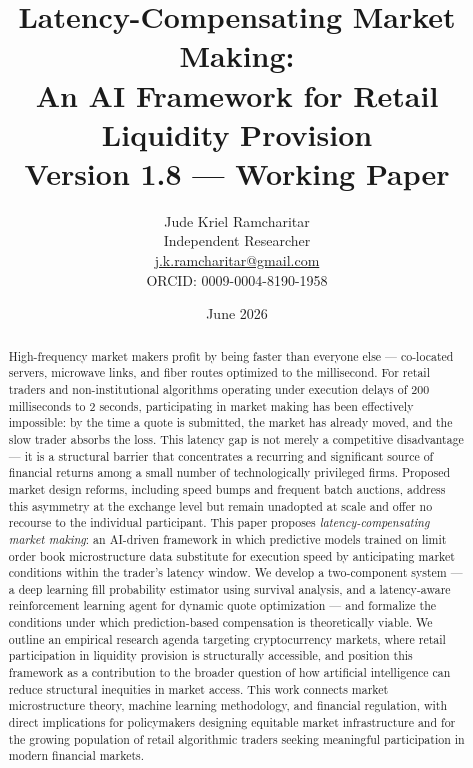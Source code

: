 \documentclass[12pt]{article}
\title{
  \textbf{Latency-Compensating Market Making:}\\[4pt]
  \textbf{An AI Framework for Retail Liquidity Provision}\\[10pt]
  \large Version 1.8 --- Working Paper
}
\author{
  Jude Kriel Ramcharitar\\[4pt]
  \small Independent Researcher\\
  \small \href{mailto:j.k.ramcharitar@gmail.com}{j.k.ramcharitar@gmail.com}\\
  \small ORCID: 0009-0004-8190-1958
}
\date{June 2026}
\begin{document}
\maketitle
\thispagestyle{empty}

\begin{abstract}
High-frequency market makers profit by being faster than everyone else --- co-located servers, microwave links, and fiber routes optimized to the millisecond. For retail traders and non-institutional algorithms operating under execution delays of 200 milliseconds to 2 seconds, participating in market making has been effectively impossible: by the time a quote is submitted, the market has already moved, and the slow trader absorbs the loss. This latency gap is not merely a competitive disadvantage --- it is a structural barrier that concentrates a recurring and significant source of financial returns among a small number of technologically privileged firms. Proposed market design reforms, including speed bumps and frequent batch auctions, address this asymmetry at the exchange level but remain unadopted at scale and offer no recourse to the individual participant. This paper proposes \emph{latency-compensating market making}: an AI-driven framework in which predictive models trained on limit order book microstructure data substitute for execution speed by anticipating market conditions within the trader's latency window. We develop a two-component system --- a deep learning fill probability estimator using survival analysis, and a latency-aware reinforcement learning agent for dynamic quote optimization --- and formalize the conditions under which prediction-based compensation is theoretically viable. We outline an empirical research agenda targeting cryptocurrency markets, where retail participation in liquidity provision is structurally accessible, and position this framework as a contribution to the broader question of how artificial intelligence can reduce structural inequities in market access. This work connects market microstructure theory, machine learning methodology, and financial regulation, with direct implications for policymakers designing equitable market infrastructure and for the growing population of retail algorithmic traders seeking meaningful participation in modern financial markets.
\end{abstract}

\newpage
\tableofcontents
\newpage

\end{document}
